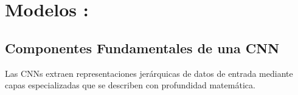 






\section{Modelos :}


\subsection{Componentes Fundamentales de una CNN}



Las CNNs extraen representaciones jerárquicas de datos de entrada mediante capas especializadas que se describen con profundidad matemática. 

